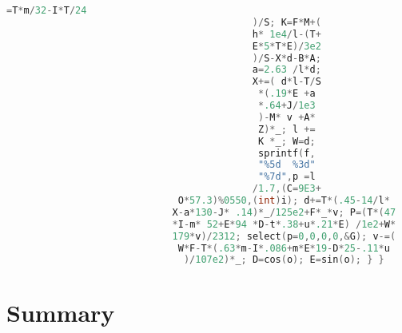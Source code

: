 {\begin{lstlisting}[language=C++]
                                          =T*m/32-I*T/24
                                           )/S; K=F*M+(
                                           h* 1e4/l-(T+
                                           E*5*T*E)/3e2
                                           )/S-X*d-B*A;
                                           a=2.63 /l*d;
                                           X+=( d*l-T/S
                                            *(.19*E +a
                                            *.64+J/1e3
                                            )-M* v +A*
                                            Z)*_; l +=
                                            K *_; W=d;
                                            sprintf(f,
                                            "%5d  %3d"
                                            "%7d",p =l
                                           /1.7,(C=9E3+
                              O*57.3)%0550,(int)i); d+=T*(.45-14/l*
                             X-a*130-J* .14)*_/125e2+F*_*v; P=(T*(47
                             *I-m* 52+E*94 *D-t*.38+u*.21*E) /1e2+W*
                             179*v)/2312; select(p=0,0,0,0,&G); v-=(
                              W*F-T*(.63*m-I*.086+m*E*19-D*25-.11*u
                               )/107e2)*_; D=cos(o); E=sin(o); } }
 \end{lstlisting}
}

\section{Summary}

